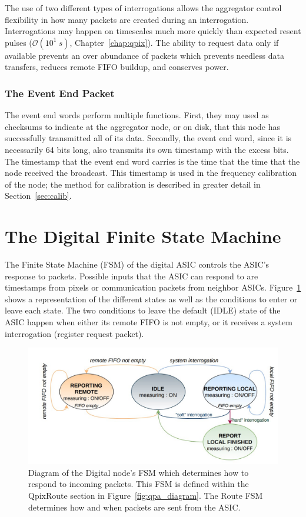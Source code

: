 The use of two different types of interrogations allows the aggregator control flexibility in how many packets are created during an interrogation.
Interrogations may happen on timescales much more quickly than expected resent pulses ($\mathcal{O}(10^{1}~\unit{s})$, Chapter~\ref{chap:qpix}).
The ability to request data only if available prevents an over abundance of packets which prevents needless data transfers, reduces remote FIFO buildup, and conserves power.

\subsubsection{The Event End Packet}
The event end words perform multiple functions.
First, they may used as checksums to indicate at the aggregator node, or on disk, that this node has successfully transmitted all of its data.
Secondly, the event end word, since it is necessarily 64 bits long, also transmits its own timestamp with the excess bits.
The timestamp that the event end word carries is the time that the time that the node received the broadcast.
This timestamp is used in the frequency calibration of the node; the method for calibration is described in greater detail in Section~\ref{sec:calib}.

\section{The Digital Finite State Machine}\label{sec:digital_fsm}
The Finite State Machine (FSM) of the digital ASIC controls the ASIC's response to packets.
Possible inputs that the ASIC can respond to are timestamps from pixels or communication packets from neighbor ASICs.
Figure~\ref{fig:digital_fsm} shows a representation of the different states as well as the conditions to enter or leave each state.
The two conditions to leave the default (IDLE) state of the ASIC happen when either its remote FIFO is not empty, or it receives a system interrogation (register request packet).

\begin{figure}[]
\centering
\includegraphics[width=\textwidth]{images/digital_fsm_overview.jpg}
\caption{Diagram of the Digital node's FSM which determines how to respond to incoming packets.
This FSM is defined within the QpixRoute section in Figure~\ref{fig:qpa_diagram}.
The Route FSM determines how and when packets are sent from the ASIC.
}
\label{fig:digital_fsm}
\end{figure}

